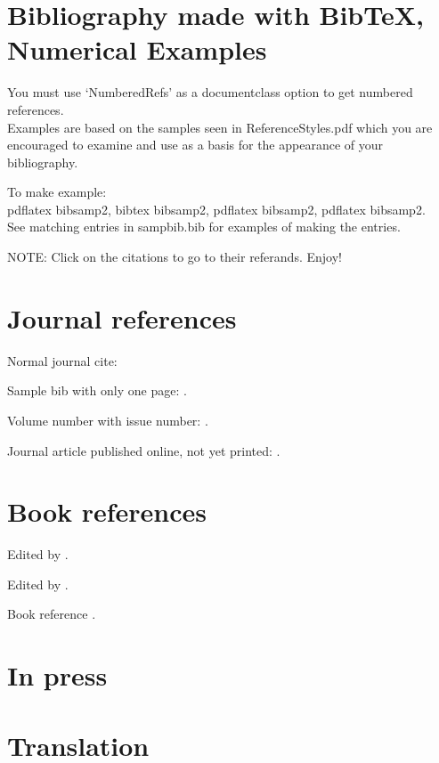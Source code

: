 \documentclass[preprint, NumberedRefs]{JASA}
\begin{document}
\section*{Bibliography made with BibTeX, Numerical Examples}

You must use `NumberedRefs' as a documentclass option to get
numbered references.\\
Examples are based on the samples seen in ReferenceStyles.pdf which you
are encouraged to examine and use as a basis for the appearance of your bibliography.

To make example:\\
 pdflatex bibsamp2, bibtex bibsamp2, pdflatex bibsamp2, pdflatex
 bibsamp2.\\
 See matching entries in sampbib.bib for examples of making the entries.

NOTE: Click on the citations to go to their referands. Enjoy!

\section*{Journal references}

 Normal journal cite: \cite{joursamp1}

 Sample bib with only one page: \cite{joursamp2}.

 Volume number with issue number: \cite{yang}.

Journal article published online, not yet printed: \cite{samponline}.


\section*{Book references}

Edited by \cite{sampincollection3}.

Edited by \cite{sampincollection4}.

Book reference \cite{booksamp1}.


\section*{In press}

\cite{inpress1,inpressSmith}


\section*{Translation}

\cite{translation}
\end{document}

